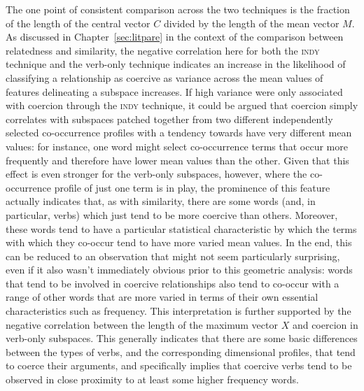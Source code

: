 The one point of consistent comparison across the two techniques is the fraction of the length of the central vector $C$ divided by the length of the mean vector $M$.  As discussed in Chapter~\ref{sec:litpare} in the context of the comparison between relatedness and similarity, the negative correlation here for both the \textsc{indy} technique and the verb-only technique indicates an increase in the likelihood of classifying a relationship as coercive as variance across the mean values of features delineating a subspace increases.  If high variance were only associated with coercion through the \textsc{indy} technique, it could be argued that coercion simply correlates with subspaces patched together from two different independently selected co-occurrence profiles with a tendency towards have very different mean values: for instance, one word might select co-occurrence terms that occur more frequently and therefore have lower mean values than the other.  Given that this effect is even stronger for the verb-only subspaces, however, where the co-occurrence profile of just one term is in play, the prominence of this feature actually indicates that, as with similarity, there are some words (and, in particular, verbs) which just tend to be more coercive than others.  Moreover, these words tend to have a particular statistical characteristic by which the terms with which they co-occur tend to have more varied mean values.  In the end, this can be reduced to an observation that might not seem particularly surprising, even if it also wasn't immediately obvious prior to this geometric analysis: words that tend to be involved in coercive relationships also tend to co-occur with a range of other words that are more varied in terms of their own essential characteristics such as frequency.  This interpretation is further supported by the negative correlation between the length of the maximum vector $X$ and coercion in verb-only subspaces.  This generally indicates that there are some basic differences between the types of verbs, and the corresponding dimensional profiles, that tend to coerce their arguments, and specifically implies that coercive verbs tend to be observed in close proximity to at least some higher frequency words.


